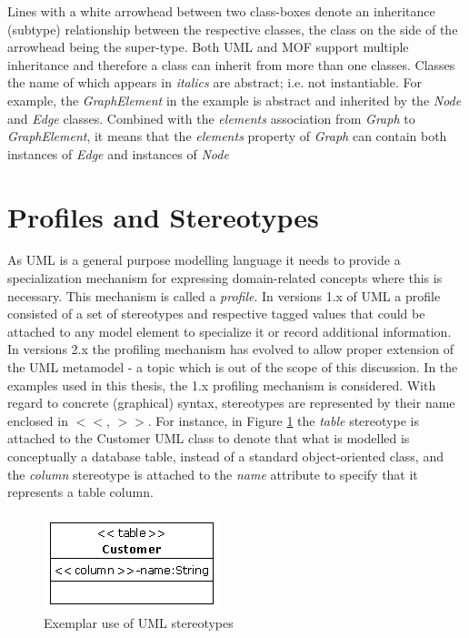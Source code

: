 Lines with a white arrowhead between two class-boxes denote an inheritance (subtype) relationship between the respective classes, the class on the side of the arrowhead being the super-type. Both UML and MOF support multiple inheritance and therefore a class can inherit from more than one classes. Classes the name of which appears in \emph{italics} are abstract; i.e. not instantiable. For example, the \emph{GraphElement} in the example is abstract and inherited by the \emph{Node} and \emph{Edge} classes. Combined with the \emph{elements} association from \emph{Graph} to \emph{GraphElement}, it means that the \emph{elements} property of \emph{Graph} can contain both instances of \emph{Edge} and instances of \emph{Node} 

\section{Profiles and Stereotypes}

As UML is a general purpose modelling language it needs to provide a specialization mechanism for expressing domain-related concepts where this is necessary. This mechanism is called a \emph{profile}. In versions 1.x of UML a profile consisted of a set of stereotypes and respective tagged values that could be attached to any model element to specialize it or record additional information. In versions 2.x the profiling mechanism has evolved to allow proper extension of the UML metamodel - a topic which is out of the scope of this discussion. In the examples used in this thesis, the 1.x profiling mechanism is considered. With regard to concrete (graphical) syntax, stereotypes are represented by their name enclosed in $<<$, $>>$. For instance, in Figure \ref{fig:Stereotypes} the \emph{table} stereotype is attached to the Customer UML class to denote that what is modelled is conceptually a database table, instead of a standard object-oriented class, and the \emph{column} stereotype is attached to the \emph{name} attribute to specify that it represents a table column.

\begin{figure}
	\centering
		\includegraphics{images/Stereotypes}
	\caption{Exemplar use of UML stereotypes}
	\label{fig:Stereotypes}
\end{figure}




